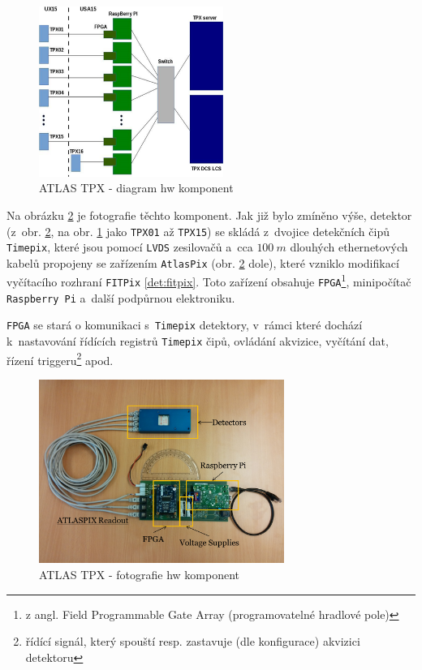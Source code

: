 \begin{figure}[t]
	\begin{center}
		\includegraphics[width=6cm]{figures/tpx_hw_diagram.png}
		\caption{ATLAS TPX - diagram hw komponent}
		\label{fig:tpx_hw_diagram}
	\end{center}
\end{figure}

Na obrázku \ref{fig:tpx_hw_foto} je fotografie  těchto komponent. Jak již bylo zmíněno výše, detektor (z~obr. \ref{fig:tpx_hw_foto}, na obr. \ref{fig:tpx_hw_diagram} jako \texttt{TPX01} až \texttt{TPX15}) se skládá z~dvojice detekčních čipů \texttt{Timepix}, které jsou pomocí \texttt{LVDS} zesilovačů a~cca $100~m$ dlouhých ethernetových kabelů propojeny se zařízením \texttt{AtlasPix} (obr. \ref{fig:tpx_hw_foto} dole), které vzniklo modifikací vyčítacího rozhraní \texttt{FITPix} \ref{det:fitpix}. Toto zařízení obsahuje \texttt{FPGA}\footnote{z angl. Field Programmable Gate Array (programovatelné hradlové pole)}, minipočítač \texttt{Raspberry Pi} a~další podpůrnou elektroniku. 

\texttt{FPGA} se stará o komunikaci s~\texttt{Timepix} detektory, v~rámci které dochází k~nastavování řídících registrů \texttt{Timepix} čipů, ovládání akvizice, vyčítání dat, řízení triggeru\footnote{řídící signál, který spouští resp. zastavuje (dle konfigurace) akvizici detektoru} apod.

\begin{figure}[t]
	\begin{center}
		\includegraphics[width=8cm]{figures/tpx_hw_foto.png}
		\caption{ATLAS TPX - fotografie hw komponent}
		\label{fig:tpx_hw_foto}
	\end{center}
\end{figure}

